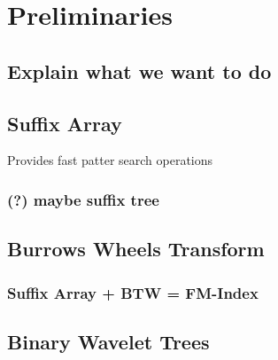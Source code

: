 
\chapter{Preliminaries} %

\label{ch:Chapter2} %


\section{Explain what we want to do}

\lipsum[1-2]


\section{Suffix Array}

Provides fast patter search operations

\subsection{(?) maybe suffix tree}

\lipsum[3-4]


\section{Burrows Wheels Transform}

\lipsum[5-6]

\subsection{Suffix Array + BTW = FM-Index}

\lipsum[7-8]


\section{Binary Wavelet Trees}

